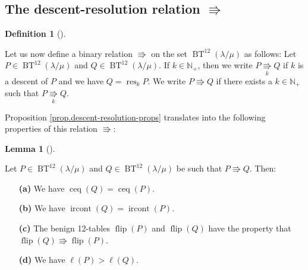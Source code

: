 \documentclass[numbers=enddot,12pt,final,onecolumn,notitlepage]{scrartcl}%
\theoremstyle{definition}
\newtheorem{lem}[theo]{Lemma}
\newenvironment{lemma}[1][]
{\begin{lem}[#1]\begin{leftbar}}
{\end{leftbar}\end{lem}}
\newtheorem{defi}[theo]{Definition}
\newenvironment{definition}[1][]
{\begin{defi}[#1]\begin{leftbar}}
{\end{leftbar}\end{defi}}
\def\BenignTables{{\operatorname{BT}^{12}\left(  \lambda/\mu\right)}}
\begin{document}

\subsection{The descent-resolution relation $\Rrightarrow$}

\begin{definition}
Let us now define a binary relation $\Rrightarrow$ on the set $\BenignTables$ as
follows: Let $P\in\BenignTables$ and $Q\in\BenignTables$. If $k\in\mathbb{N}_{+}$,
then we write $P\underset{k}{\Rrightarrow}Q$ if $k$ is a descent
of $P$ and we have $Q=\operatorname*{res}\nolimits_{k}P$. We write $P\Rrightarrow Q$ if there
exists a $k\in\mathbb{N}_{+}$ such that $P\underset{k}{\Rrightarrow}Q$.
\end{definition}

Proposition \ref{prop.descent-resolution-props} translates into the following properties of this relation
$\Rrightarrow$:

\begin{lemma}
\label{lem.descent-resolution-props}Let $P\in\BenignTables$ and $Q\in\BenignTables$
be such that $P\Rrightarrow Q$. Then:

\begin{enumerate}
\item[\textbf{(a)}] We have $\operatorname*{ceq}\left(  Q\right)
=\operatorname*{ceq}\left(  P\right)  $.

\item[\textbf{(b)}] We have $\operatorname*{ircont}\left(  Q\right)
=\operatorname*{ircont}\left(  P\right)  $.

\item[\textbf{(c)}] The benign 12-tables $\operatorname*{flip}\left(  P\right)  $ and
$\operatorname*{flip}\left(  Q\right)  $ have the property that
$\operatorname*{flip}\left(  Q\right)  \Rrightarrow\operatorname*{flip}\left(
P\right)  $.

\item[\textbf{(d)}] We have $\ell\left(  P\right)  >\ell\left(  Q\right)  $.

\end{enumerate}
\end{lemma}
\end{document}
